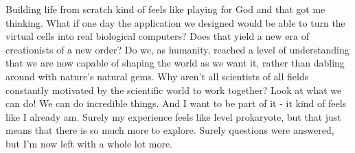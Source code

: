 \documentclass{article}
\begin{document}
Building life from scratch kind of feels like playing for God and that got me thinking. What if one day the application we designed would be able to turn the virtual cells into real biological computers? Does that yield a new era of creationists of a new order? Do we, as humanity, reached a level of understanding that we are now capable of shaping the world as we want it, rather than dabling around with nature's natural gems. Why aren't all scientists of all fields constantly motivated by the scientific world to work together? Look at what we can do! We can do incredible things. And I want to be part of it - it kind of feels like I already am. Surely my experience feels like level prokaryote, but that just means that there is so much more to explore. Surely questions were answered, but I'm now left with a whole lot more.
\end{document}

